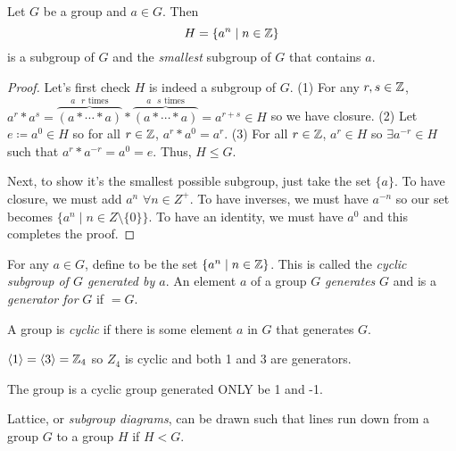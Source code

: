 \begin{theorem}
    Let $G$ be a group and $a \in G$. Then $$H = \{a^n \mid n \in \mathbb{Z}\}$$ is a subgroup of $G$ and the \emph{smallest} subgroup of $G$ that contains $a$.
\end{theorem}
\begin{proof}
    Let's first check $H$ is indeed a subgroup of $G$. (1) For any $r,s \in \mathbb{Z}$, $a^r*a^s = \overbrace{(a*\cdots*a)}^{\text{$a$ $r$ times}}*\overbrace{(a*\cdots*a)}^{\text{$a$ $s$ times}}=a^{r+s} \in H$ so we have closure. (2) Let $e \coloneq a^0 \in H$ so for all $r \in \mathbb{Z}$, $a^r*a^0=a^r$. (3) For all $r \in \mathbb{Z}$, $a^r \in H$ so $\exists a^{-r} \in H$ such that $a^r*a^{-r} = a^0 = e$. Thus, $H \leq G$.

    Next, to show it's the smallest possible subgroup, just take the set $\{a\}$. To have closure, we must add $a^n$ $\forall n\in Z^+$. To have inverses, we must have $a^{-n}$ so our set becomes $\{a^n \mid n \in Z\setminus\{0\}\}$. To have an identity, we must have $a^0$ and this completes the proof.
\end{proof}
\begin{definition}
    For any $a \in G$, define  to be the set $\{a^n \mid n \in \mathbb{Z}\}$. This is called the \emph{cyclic subgroup of $G$ generated by $a$}. An element $a$ of a group $G$ \emph{generates} $G$ and is a \emph{generator for} $G$ if  $= G$.
\end{definition}
\begin{definition}
    A group is \emph{cyclic} if there is some element $a$ in $G$ that generates $G$.
\end{definition}
\begin{example}
    $\langle 1 \rangle = \langle 3 \rangle = \mathbb{Z}_4$ so $Z_4$ is cyclic and both 1 and 3 are generators.
\end{example}
\begin{example}
    The group \group{$\Z$}{+} is a cyclic group generated ONLY be 1 and -1.
\end{example}
\begin{remark}
    Lattice, or \emph{subgroup diagrams}, can be drawn such that lines run down from a group $G$ to a group $H$ if $H < G$. 
\end{remark}
